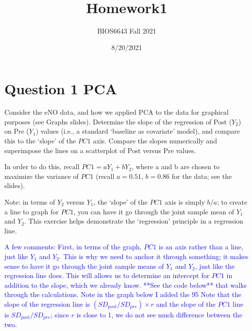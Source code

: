 \documentclass[
  12pt,
]{article}
\title{Homework1}
\subtitle{BIOS6643 Fall 2021}
\author{}
\date{\vspace{-2.5em}8/20/2021}
\begin{document}
\maketitle

\hypertarget{question-1-pca}{%
\section{Question 1 PCA}\label{question-1-pca}}

Consider the eNO data, and how we applied PCA to the data for graphical
purposes (see Graphs slides). Determine the slope of the regression of
Post (\(Y_2\)) on Pre (\(Y_1\)) values (i.e., a standard `baseline as
covariate' model), and compare this to the `slope' of the \(PC1\) axis.
Compare the slopes numerically and superimpose the lines on a
scatterplot of Post versus Pre values.

In order to do this, recall \(PC1 = a Y_1 + b Y_2\), where a and b are
chosen to maximize the variance of \(PC1\) (recall \(a=0.51\),
\(b=0.86\) for the data; see the slides).

Note: in terms of \(Y_2\) versus \(Y_1\), the `slope' of the \(PC1\)
axis is simply \(b/a\); to create a line to graph for \(PC1\), you can
have it go through the joint sample mean of \(Y_1\) and \(Y_2\). This
exercise helps demonstrate the `regression' principle in a regression
line.

\textcolor{blue}{A few comments: First, in terms of the graph, $PC1$ is an axis rather than a line, just like $Y_1$ and $Y_2$. This is why we need to anchor it through something; it makes sense to have it go through the joint sample means of $Y_1$ and $Y_2$, just like the regression line does. This will allows us to determine an intercept for $PC1$ in addition to the slope, which we already know. **See the code below** that walks through the calculations. Note in the graph below I added the 95%
Note that the slope of the regression line is $(SD_{post} / SD_{pre}) \times r$ and the slope of the $PC1$ line is $SD_{post} / SD_{pre}$; since $r$ is close to 1, we do not see much difference between the two.}
\end{document}
